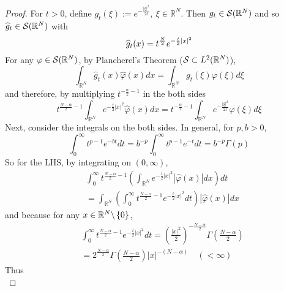 \begin{proof}
	For $t > 0$, define $g_t(\xi):=e^{-\frac{|\xi|^2}{2 t}},~\xi \in \mathbb{R}^N$. Then $g_t \in \mathcal{S}(\mathbb{R}^N)$ and so $\widehat{g}_t \in \mathcal{S}(\mathbb{R}^N)$ with
	\begin{equation*}
		\widehat{g}_t(x) = t^{\frac{N}{2}}e^{-\frac{t}{2}\left\lvert x\right\lvert^2}
	\end{equation*}
	For any $\varphi \in \mathcal{S}(\mathbb{R}^N)$, by Plancherel's Theorem ($\mathcal{S} \subset L^2(\mathbb{R}^N)$), 
	\begin{equation*}
		\int_{\mathbb{R}^N} \widehat{g}_t(x) \widehat{\varphi}(x) d x=\int_{\mathbb{R}^N} g_t(\xi) \varphi(\xi) d \xi
	\end{equation*}
	and therefore, by multiplying $t^{-\frac{\alpha}{2}-1}$ in the both sides
	\begin{equation*}
		t^{\frac{N-\alpha}{2}-1} \int_{\mathbb{R}^N} e^{-\frac{t}{2}|x|^2} \widehat{\varphi}(x) d x=t^{-\frac{\alpha}{2}-1} \int_{\mathbb{R}^N} e^{-\frac{|\xi|^2}{2 t}} \varphi(\xi) d \xi
	\end{equation*}
	Next, consider the integrals on the both sides. In general, for $p,b> 0$,
	\begin{equation*}
		\int_0^{\infty} t^{p-1} e^{-b t} d t=b^{-p} \int_0^{\infty} t^{p-1} e^{-t} d t=b^{-p} \Gamma(p)
	\end{equation*}
	So for the LHS, by integrating on $(0,\infty)$,
	\begin{equation*}
		\begin{aligned}
			& \int_0^{\infty} t^{\frac{N-\alpha}{2}-1}\left(\int_{\mathbb{R}^N} e^{-\frac{t}{2}|x|^2}|\widehat{\varphi}(x)| d x\right) d t \\
			& =\int_{\mathbb{R}^N}\left(\int_0^{\infty} t^{\frac{N-\alpha}{2}-1} e^{-\frac{t}{2}|x|^2} d t\right)|\widehat{\varphi}(x)| d x
			\end{aligned}
	\end{equation*}
	and because for any $x \in \mathbb{R}^N\backslash \left\{0\right\}$,
	\begin{equation*}
		\begin{aligned}
			& \int_0^{\infty} t^{\frac{N-\alpha}{2}-1} e^{-\frac{t}{2}|x|^2} d t=\left(\frac{|x|^2}{2}\right)^{-\frac{N-\alpha}{2}} \Gamma\left(\frac{N-\alpha}{2}\right) \\
			& =2^{\frac{N-\alpha}{2}} \Gamma\left(\frac{N-\alpha}{2}\right)|x|^{-(N-\alpha)} \quad(<\infty)
		\end{aligned}
	\end{equation*}
	Thus
	\begin{equation*}

\end{equation*}
\end{proof}
